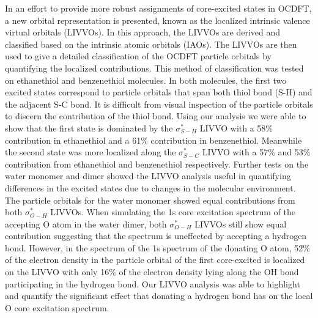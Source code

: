 \documentclass{article}
\begin{document}
In an effort to provide more robust assignments of core-excited states in OCDFT, a new orbital representation is presented, known as the localized intrinsic valence virtual orbitals (LIVVOs). In this approach, the LIVVOs are derived and classified based on the intrinsic atomic orbitals (IAOs). The LIVVOs are then used to give a detailed classification of the OCDFT particle orbitals by quantifying the localized contributions. This method of classification was tested on ethanethiol and benzenethiol molecules. In both molecules, the first two excited states correspond to particle orbitals that span both thiol bond (S-H) and the adjacent S-C bond. It is difficult from visual inspection of the particle orbitals to discern the contribution of the thiol bond. Using our analysis we were able to show that the first state is dominated by the $\sigma^*_{S-H}$ LIVVO with a 58\% contribution in ethanethiol and a 61\% contribution in benzenethiol. Meanwhile the second state was more localized along the $\sigma^*_{S-C}$ LIVVO with a 57\% and 53\% contribution from ethanethiol and benzenethiol respectively. Further tests on the water monomer and dimer showed the LIVVO analysis useful in quantifying differences in the excited states due to changes in the molecular environment. The particle orbitals for the water monomer showed equal contributions from both $\sigma^*_{O-H}$ LIVVOs. When simulating the 1s core excitation spectrum of the accepting O atom in the water dimer, both $\sigma^*_{O-H}$ LIVVOs still show equal contribution suggesting that the spectrum is uneffected by accepting a hydrogen bond. However, in the spectrum of the 1s spectrum of the donating O atom, 52\% of the electron density in the particle orbital of the first core-excited is localized on the LIVVO with only 16\% of the electron density lying along the OH bond participating in the hydrogen bond. Our LIVVO analysis was able to highlight and quantify the significant effect that donating a hydrogen bond has on the local O core excitation spectrum.
\end{document}
